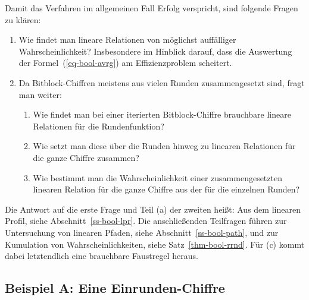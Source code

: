 \begin{refsegment}
Damit das Verfahren im allgemeinen Fall Erfolg verspricht, sind
folgende Fragen zu klären:
\begin{enumerate}
	\item Wie findet man lineare
        Relationen
        von möglichst auffälliger
        Wahrscheinlichkeit? Insbesondere im Hinblick darauf, dass die
        Auswertung der Formel~(\ref{eq-bool-avrg}) am Effizienzproblem
        scheitert.
     \item Da Bitblock-Chiffren meistens aus
        vielen Runden zusammengesetzt sind, fragt man weiter:
	\begin{enumerate}
	  \item Wie findet man bei einer iterierten Bitblock-Chiffre
	    brauchbare lineare Relationen für die Rundenfunktion?
	  \item Wie setzt man diese über die Runden hinweg zu linearen Relationen
	    für die ganze Chiffre zusammen?
	  \item Wie bestimmt man die Wahrscheinlichkeit einer zusammengesetzten
	    linearen Relation für die ganze Chiffre aus der für die einzelnen
	    Runden?
	\end{enumerate}
\end{enumerate}

Die Antwort auf die erste Frage und Teil (a) der zweiten heißt:
Aus dem linearen Profil,
siehe Abschnitt~\ref{ss-bool-lpr}. Die anschließenden
Teilfragen führen zur Untersuchung von linearen
Pfaden,
siehe Abschnitt~\ref{ss-bool-path}, und zur Kumulation von
Wahrscheinlichkeiten, siehe Satz~\ref{thm-bool-rrnd}. Für (c) kommt
dabei letztendlich eine brauchbare Faustregel heraus.

\subsection{Beispiel A: Eine Einrunden-Chiffre}\label{ss-bool-bsp1}


\end{refsegment}
